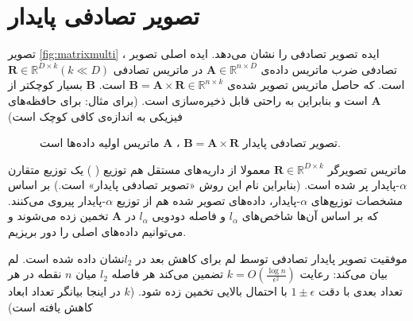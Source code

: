 \section{تصویر تصادفی پایدار}
تصویر
\autoref{fig:matrixmulti}
، ایده تصویر تصادفی را نشان می‌دهد. ایده اصلی تصویر تصادفی ضرب ماتریس داده‌ی 
$\mathbf{A} \in \mathbb{R}^{n \times D}$
در ماتریس تصادفی 
$\mathbf{R} \in \mathbb{R}^{D \times k} (k \ll D)$
است. که حاصل ماتریس تصویر شده‌ی 
$\mathbf{B} = \mathbf{A} \times \mathbf{R} \in \mathbb{R}^{n \times k}$
است. 
$\mathbf{B}$
بسیار کوچکتر از 
$\mathbf{A}$
است و بنابراین به راحتی قابل ذخیره‌سازی است. (برای مثال: برای حافظه‌های فیزیکی به اندازه‌ی کافی کوچک است)

\begin{figure}[h]
\centering
\begin{latin}
\end{latin}
\caption{
تصویر تصادفی پایدار 
$\mathbf{B} = \mathbf{A} \times \mathbf{R}$
،
$\mathbf{A}$
ماتریس اولیه داده‌ها است.
}
\label{fig:matrixmulti}
\end{figure}

ماتریس تصویرگر 
$\mathbf{R} \in \mathbb{R}^{D \times k}$
معمولا از داریه‌های مستقل هم توزیع (
) یک توزیع متقارن $\alpha$-پایدار پر شده است.
\cite{litez171}
(بنابراین نام این روش «تصویر تصادفی پایدار» است.)
بر اساس مشخصات توزیع‌های $\alpha$-پایدار، داده‌های تصویر شده هم از توزیع $\alpha$-پایدار پیروی می‌کنند. که بر اساس آن‌ها شاخص‌های $l_\alpha$ و فاصله دودویی $l_\alpha$ در $\mathbf{A}$ تخمین زده می‌شوند و می‌توانیم داده‌های اصلی را دور بریزیم.

موفقیت تصویر پایدار تصادفی توسط لم 
\cite{litez103}
برای کاهش بعد در $l_2$نشان داده شده است. لم
بیان می‌کند: رعایت
$k = O \left ( \frac{\log n}{\epsilon^2 } \right ) $
تضمین می‌کند هر فاصله $l_2$ میان $n$ نقطه در هر تعداد بعدی با دقت 
$1\pm\epsilon$
 با احتمال بالایی تخمین زده شود. ($k$ در اینجا بیانگر تعداد ابعاد کاهش یافته است)

